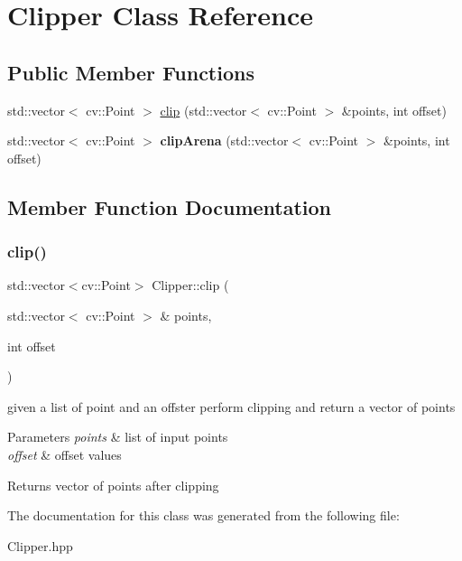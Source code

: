 \hypertarget{class_clipper}{}\section{Clipper Class Reference}
\label{class_clipper}
\subsection*{Public Member Functions}
\begin{DoxyCompactItemize}
\item 
std\+::vector$<$ cv\+::\+Point $>$ \mbox{\hyperlink{class_clipper_a1ba92442f058e13b6dfc1a9701f03f50}{clip}} (std\+::vector$<$ cv\+::\+Point $>$ \&points, int offset)
\item 
\mbox{\label{class_clipper_ac427150be7e8e3a7db52cf4edec7ab4d}} 
std\+::vector$<$ cv\+::\+Point $>$ {\bfseries clip\+Arena} (std\+::vector$<$ cv\+::\+Point $>$ \&points, int offset)
\end{DoxyCompactItemize}


\subsection{Member Function Documentation}
\mbox{\label{class_clipper_a1ba92442f058e13b6dfc1a9701f03f50}} 
\subsubsection{\texorpdfstring{clip()}{clip()}}
{\footnotesize\ttfamily std\+::vector$<$cv\+::\+Point$>$ Clipper\+::clip (\begin{DoxyParamCaption}\item[{std\+::vector$<$ cv\+::\+Point $>$ \&}]{points,  }\item[{int}]{offset }\end{DoxyParamCaption})}

given a list of point and an offster perform clipping and return a vector of points 
\begin{DoxyParams}{Parameters}
{\em points} & list of input points \\
\hline
{\em offset} & offset values \\
\hline
\end{DoxyParams}
\begin{DoxyReturn}{Returns}
vector of points after clipping 
\end{DoxyReturn}


The documentation for this class was generated from the following file\+:\begin{DoxyCompactItemize}
\item 
Clipper.\+hpp\end{DoxyCompactItemize}
